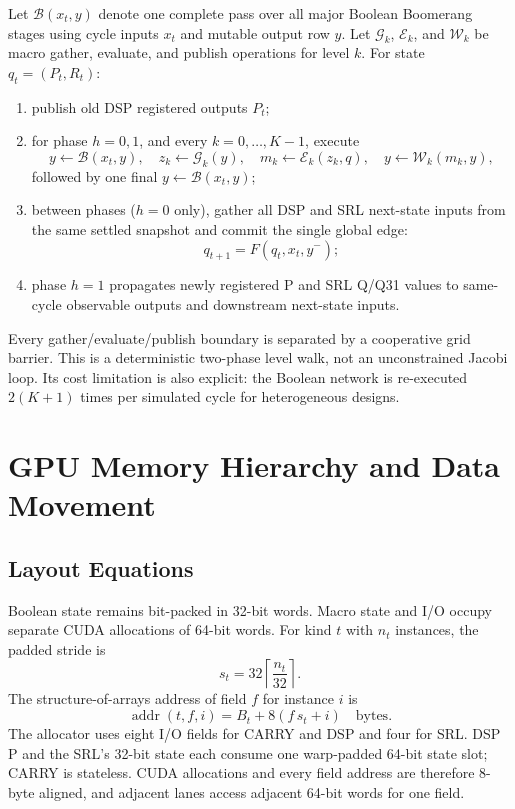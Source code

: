 \documentclass[11pt,a4paper]{article}
\begin{document}
Let $\mathcal{B}(x_t,y)$ denote one complete pass over all major Boolean
Boomerang stages using cycle inputs $x_t$ and mutable output row $y$.  Let
$\mathcal{G}_k$, $\mathcal{E}_k$, and $\mathcal{W}_k$ be macro gather,
evaluate, and publish operations for level $k$.  For state $q_t=(P_t,R_t)$:

\begin{enumerate}
  \item publish old DSP registered outputs $P_t$;
  \item for phase $h=0,1$, and every $k=0,\ldots,K-1$, execute
  \[
    y\leftarrow\mathcal{B}(x_t,y),\quad
    z_k\leftarrow\mathcal{G}_k(y),\quad
    m_k\leftarrow\mathcal{E}_k(z_k,q),\quad
    y\leftarrow\mathcal{W}_k(m_k,y),
  \]
  followed by one final $y\leftarrow\mathcal{B}(x_t,y)$;
  \item between phases ($h=0$ only), gather all DSP and SRL next-state inputs
        from the same settled snapshot and commit the single global edge:
  \[
      q_{t+1}=F(q_t,x_t,y^-);
  \]
  \item phase $h=1$ propagates newly registered P and SRL Q/Q31 values to
        same-cycle observable outputs and downstream next-state inputs.
\end{enumerate}

Every gather/evaluate/publish boundary is separated by a cooperative grid
barrier.  This is a deterministic two-phase level walk, not an unconstrained
Jacobi loop.  Its cost limitation is also explicit: the Boolean network is
re-executed $2(K+1)$ times per simulated cycle for heterogeneous designs.

\section{GPU Memory Hierarchy and Data Movement}

\subsection{Layout Equations}

Boolean state remains bit-packed in 32-bit words.  Macro state and I/O occupy
separate CUDA allocations of 64-bit words.  For kind $t$ with $n_t$ instances,
the padded stride is
\[
  s_t=32\left\lceil\frac{n_t}{32}\right\rceil.
\]
The structure-of-arrays address of field $f$ for instance $i$ is
\[
  \operatorname{addr}(t,f,i)=B_t+8\left(f\,s_t+i\right)\quad\text{bytes}.
\]
The allocator uses eight I/O fields for CARRY and DSP and four for SRL.  DSP P
and the SRL's 32-bit state each consume one warp-padded 64-bit state slot;
CARRY is stateless.  CUDA allocations and every field address are therefore
8-byte aligned, and adjacent lanes access adjacent 64-bit words for one field.
\end{document}
